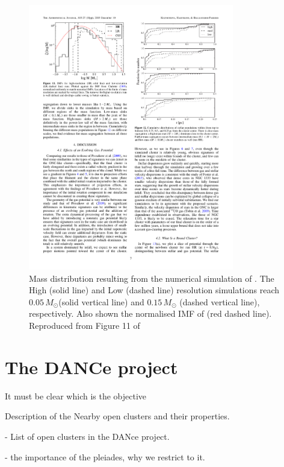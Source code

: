 \begin{figure}[htbp]
\begin{center}
\includegraphics[width=0.8\textwidth]{background/Figures/F11_Kuznetsova2015.pdf}
\caption{Mass distribution resulting from the numerical simulation of \citet{2015ApJ...815...27K}. The High (solid line) and Low (dashed line) resolution simulations reach $0.05\, M_{\odot}$(solid vertical line) and $0.15\, M_{\odot}$ (dashed vertical line), respectively. Also shown the normalised IMF of \citet{Chabrier2005} (red dashed line). Reproduced from Figure 11 of \citet{2015ApJ...815...27K}}
\label{fig:IMFKuznetsova}
\end{center}
\end{figure}

\section{The DANCe project}
\label{sect:DANCeproject}
It must be clear which is the objective

Description of the Nearby open clusters and their properties.

- List of open clusters in the DANce project.

- the importance of the pleiades, why we restrict to it.

